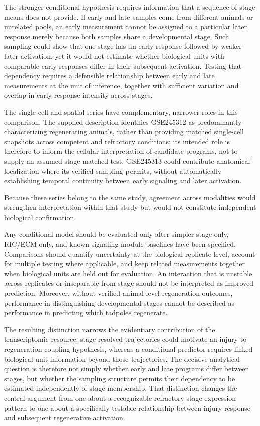 \documentclass[11pt]{article}
\begin{document}
The stronger conditional hypothesis requires information that a sequence of stage means does not provide. If early and late samples come from different animals or unrelated pools, an early measurement cannot be assigned to a particular later response merely because both samples share a developmental stage. Such sampling could show that one stage has an early response followed by weaker later activation, yet it would not estimate whether biological units with comparable early responses differ in their subsequent activation. Testing that dependency requires a defensible relationship between early and late measurements at the unit of inference, together with sufficient variation and overlap in early-response intensity across stages.

The single-cell and spatial series have complementary, narrower roles in this comparison. The supplied description identifies GSE245312 as predominantly characterizing regenerating animals, rather than providing matched single-cell snapshots across competent and refractory conditions; its intended role is therefore to inform the cellular interpretation of candidate programs, not to supply an assumed stage-matched test. GSE245313 could contribute anatomical localization where its verified sampling permits, without automatically establishing temporal continuity between early signaling and later activation.

Because these series belong to the same study, agreement across modalities would strengthen interpretation within that study but would not constitute independent biological confirmation.

Any conditional model should be evaluated only after simpler stage-only, RIC/ECM-only, and known-signaling-module baselines have been specified. Comparisons should quantify uncertainty at the biological-replicate level, account for multiple testing where applicable, and keep related measurements together when biological units are held out for evaluation. An interaction that is unstable across replicates or inseparable from stage should not be interpreted as improved prediction. Moreover, without verified animal-level regeneration outcomes, performance in distinguishing developmental stages cannot be described as performance in predicting which tadpoles regenerate.

The resulting distinction narrows the evidentiary contribution of the transcriptomic resource: stage-resolved trajectories could motivate an injury-to-regeneration coupling hypothesis, whereas a conditional predictor requires linked biological-unit information beyond those trajectories. The decisive analytical question is therefore not simply whether early and late programs differ between stages, but whether the sampling structure permits their dependency to be estimated independently of stage membership. That distinction changes the central argument from one about a recognizable refractory-stage expression pattern to one about a specifically testable relationship between injury response and subsequent regenerative activation.
\end{document}
